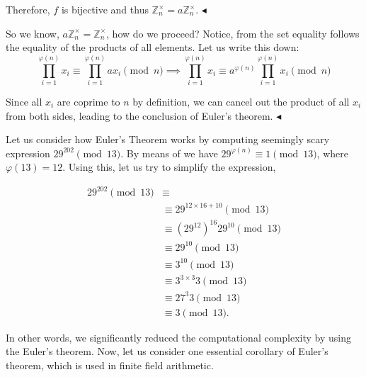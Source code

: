 \documentclass[../lecture-notes-148x210.tex]{subfiles}
\begin{document}
Therefore, $f$ is bijective and thus $\mathbb{Z}_n^{\times} = a\mathbb{Z}_n^{\times}$.
$\blacktriangleleft$

So we know, $a\mathbb{Z}_n^{\times} = \mathbb{Z}_n^{\times}$, how do we proceed? Notice, from the 
set equality follows the equality of the products of all elements. Let us write this down:
\begin{equation*}
    \prod_{i = 1}^{\varphi(n)} x_i \equiv \prod_{i = 1}^{\varphi(n)} a x_i \pmod{n} \implies \prod_{i = 1}^{\varphi(n)} x_i \equiv a^{\varphi(n)} \prod_{i = 1}^{\varphi(n)} x_i \pmod{n}
\end{equation*}    
    
Since all $x_i$ are coprime to $n$ by definition, we can cancel out the product
of all $x_i$ from both sides, leading to the conclusion of Euler's theorem.
$\blacktriangleleft$

\begin{example}
    Let us consider how Euler's Theorem works by computing seemingly scary
    expression $29^{202} \pmod{13}$. By means of  we have
    $29^{\varphi(n)} \equiv 1 \pmod{13}$, where $\varphi(13) = 12$. Using this,
    let us try to simplify the expression, 
 
    \begin{equation*}
        \begin{aligned}
            29^{202} \pmod{13}  &\equiv \\
                                &\equiv 29^{12 \times 16 + 10} \pmod{13} \\
                                &\equiv (29^{12})^{16} 29^{10} \pmod{13} \\
                                &\equiv 29^{10} \pmod{13} \\
                                &\equiv 3^{10} \pmod{13} \\
                                &\equiv 3^{3 \times 3} 3 \pmod{13} \\
                                &\equiv 27^{3}3 \pmod{13} \\
                                &\equiv 3 \pmod{13}.
        \end{aligned}
    \end{equation*}
\end{example}

In other words, we significantly reduced the computational complexity by using the Euler's theorem. Now, 
let us consider one essential corollary of Euler's theorem, which is used in finite field arithmetic.
\end{document}
